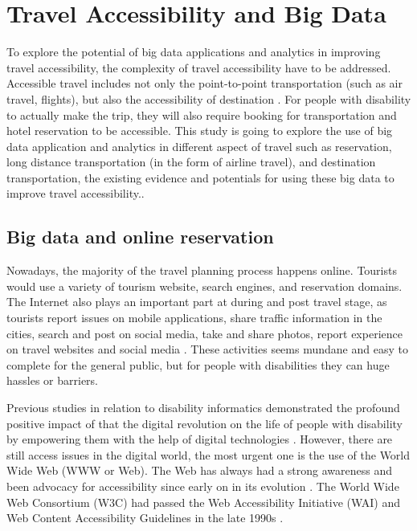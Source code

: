 \section{Travel Accessibility and Big Data}
To explore the potential of big data applications and analytics in improving travel 
accessibility, the complexity of travel accessibility have to be addressed. 
Accessible travel includes not only the point-to-point transportation (such as air
travel, flights), but also the accessibility of destination \cite{Ama,DARCY2010816,milo}.
For people with disability to actually make the trip, they will also require booking for
transportation and hotel reservation to be accessible. This study is going to 
explore the use of big data application and analytics in different aspect of 
travel such as reservation, long distance 
transportation (in the form of airline travel), and destination transportation,
the existing evidence and potentials for using these big data to improve travel 
accessibility.. 

\subsection{Big data and online reservation}
Nowadays, the majority of the travel planning process happens online. Tourists would
use a variety of tourism website, search engines, and reservation domains. The 
Internet also plays an important part at during and post travel stage, as tourists 
report issues on mobile applications, share traffic information in the cities, 
search and post on social media, take and share photos, report experience on 
travel websites and social media \cite{akerkar2012, Shafiee16}. These activities 
seems mundane and easy to complete for the general public, but for people with 
disabilities they can huge hassles or barriers.

Previous studies in relation to disability informatics  demonstrated 
the profound positive impact of  that the digital revolution on the life
of people with disability by empowering them with the help of digital 
technologies \cite{Appleyard2005}. However, there are still access issues 
in the digital world, the most urgent one is the use of the World Wide Web 
(WWW or Web). The Web has always had a strong awareness and been advocacy 
for accessibility since early on in its evolution \cite{Appleyard2005}. 
The World Wide Web Consortium (W3C) had passed the Web Accessibility Initiative
(WAI) and Web Content Accessibility Guidelines in the late 1990s \cite{Appleyard2005}. 

